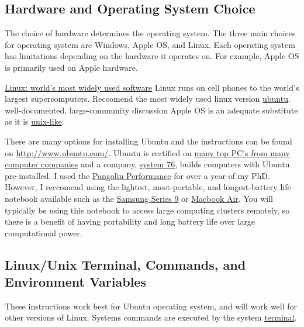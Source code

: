 \subsection{\label{A:Comp_Env:OS}Hardware and Operating System Choice}

The choice of hardware determines the operating system. The three 
main choices for operating system are Windows, Apple OS, and Linux. Each 
operating system has limitations depending on the hardware it 
operates on.   
For example, Apple OS is primarily used on Apple hardware.

\href{http://www.youtube.com/watch?v=7XTHdcmjenI}
{Linux: world's most widely used software}
Linux runs on cell phones to the world's largest supercomputers. 
Reccomend the most widely used linux version 
\href{http://www.ubuntu.com/}{ubuntu}.
well-documented, large-community discussion
Apple OS is an adequate substitute as it is 
\href{https://en.wikipedia.org/wiki/Unix-like}{unix-like}.

There are many options for installing Ubuntu and the instructions 
can be found on \href{http://www.ubuntu.com/}{http://www.ubuntu.com/}.
Ubuntu is certified on 
\href{http://www.ubuntu.com/certification/}
{many top PC's from many computer companies}
and a company, \href{https://www.system76.com/}{system 76}, 
builds computers with Ubuntu pre-installed. I used the 
\href{https://www.system76.com/laptops/model/panp9}
{Pangolin Performance} for over a year of my PhD.  However, 
I reccomend using the lightest, most-portable, and longest-battery 
life notebook available such as the 
\href{https://help.ubuntu.com/community/SamsungSeries9}
{Samsung Series 9}  
or \href{https://help.ubuntu.com/community/MacBookAir}{Macbook Air}. 
You will typically be using this notebook to access large computing 
clusters remotely, 
so there is a benefit of having portability and long 
battery life over large computational power.  

\subsection{\label{A:Comp_Env:Term}
Linux/Unix Terminal, Commands, and Environment Variables}

These instructions work best for Ubuntu operating system, and will work 
well for other versions of Linux. Systems commands are executed by the 
system 
\href{https://help.ubuntu.com/community/UsingTheTerminal}{terminal}. 


